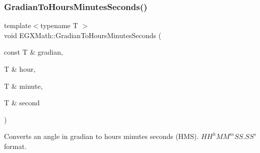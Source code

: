 \subsubsection{\texorpdfstring{Gradian\+To\+Hours\+Minutes\+Seconds()}{GradianToHoursMinutesSeconds()}}
{\footnotesize\ttfamily template$<$typename T $>$ \\
void E\+G\+X\+Math\+::\+Gradian\+To\+Hours\+Minutes\+Seconds (\begin{DoxyParamCaption}\item[{const T \&}]{gradian,  }\item[{T \&}]{hour,  }\item[{T \&}]{minute,  }\item[{T \&}]{second }\end{DoxyParamCaption})}



Converts an angle in gradian to hours minutes seconds (H\+MS). ${HH}^h{MM}^m{SS.SS}^s$ format. 

